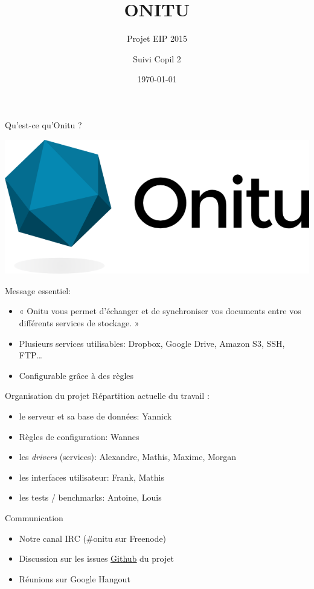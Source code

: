 \documentclass{beamer}
\begin{document}
\title[Suivi Copil]{ONITU}
\subtitle[]{Projet EIP 2015}
\author[Onitu]{Suivi Copil 2}
\date[short date]{\today}

\begin{frame}
\titlepage
\end{frame}

\begin{frame}{Qu'est-ce qu'Onitu ?}
\begin{center} 
  \includegraphics[scale=0.4]{logo.png}
\end{center} 
Message essentiel:
\begin{itemize}
  \item « Onitu vous permet d'échanger et de synchroniser vos documents entre vos différents services de stockage. »
  \item Plusieurs services utilisables: Dropbox, Google Drive, Amazon S3, SSH, FTP…
  \item Configurable grâce à des règles
\end{itemize}
\end{frame}

\begin{frame}{Organisation du projet}
Répartition actuelle du travail :
\begin{itemize}
  \item le serveur et sa base de données: Yannick
  \item Règles de configuration: Wannes
  \item les \emph{drivers} (services): Alexandre, Mathis, Maxime, Morgan 
  \item les interfaces utilisateur: Frank, Mathis 
  \item les tests / benchmarks: Antoine, Louis
\end{itemize}
\end{frame}

\begin{frame}{Communication}
\begin{itemize}
  \item Notre canal IRC (\#onitu sur Freenode)
  \item Discussion sur les issues  \underline{\hyperlink{https://github.com/onitu}{Github}} du projet
  \item Réunions sur Google Hangout
\end{itemize}
\end{frame}
\end{document}
